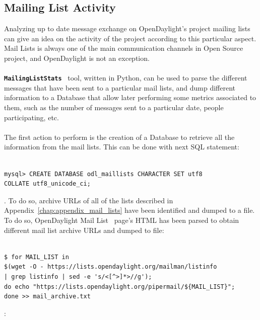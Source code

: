 \documentclass[a4paper, 12pt]{book}
\begin{document}
\subsection{Mailing List Activity}
Analyzing up to date message exchange on OpenDaylight's project mailing lists can give an idea on the activity of the project according to this particular aspect. Mail Lists is always one of the main communication channels in Open Source project, and OpenDaylight is not an exception.\\
\\
{\textbf{\texttt{MailingListStats}}}~\cite{MailStats} tool, written in Python, can be used to parse the different messages that have been sent to a particular mail lists, and dump different information to a Database that allow later performing some metrics associated to them, such as the number of messages sent to a particular date, people participating, etc.\\
\\
The first action to perform is the creation of a Database to retrieve all the information from the mail lists. This can be done with next SQL statement:

\begin{verbatim}

mysql> CREATE DATABASE odl_maillists CHARACTER SET utf8
COLLATE utf8_unicode_ci;

\end{verbatim}

. To do so, archive URLs of all of the lists described in Appendix~\ref{chap:appendix_mail_lists} have been identified and dumped to a file. To do so, OpenDaylight Mail List~\cite{OpenDaylightMailLists} page's HTML has been parsed to obtain different mail list archive URLs and dumped to file:

\begin{verbatim}

$ for MAIL_LIST in
$(wget -O - https://lists.opendaylight.org/mailman/listinfo
| grep listinfo | sed -e 's/<[^>]*>//g');
do echo "https://lists.opendaylight.org/pipermail/${MAIL_LIST}";
done >> mail_archive.txt

\end{verbatim}

:
\end{document}

